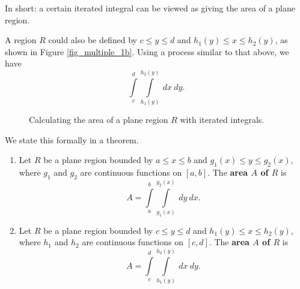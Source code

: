 In short: a certain iterated integral can be viewed as giving the area of a plane region.

A region $R$ could also be defined by $c\leq y\leq d$ and $h_1(y)\leq x\leq h_2(y)$, as shown in Figure \ref{fig_multiple_1b}. Using a process similar to that above, we have 
$$\int\limits_c^d\int\limits_{h_1(y)}^{h_2(y)} \ dx\ dy.$$


\begin{figure}[H]
\centering
\qquad
{}
\caption{Calculating the area of a plane region $R$ with iterated integrals. }
\end{figure}

We state this formally in a theorem.

\begin{theorem}\label{thm:area_plane_region}
\begin{enumerate}[align=left]
	\item Let $R$ be a plane region bounded by $a\leq x\leq b$ and $g_1(x)\leq y\leq g_2(x)$, where $g_1$ and $g_2$ are continuous functions on $[a,b]$. The \textbf{area $A$ of $R$} is
	$$A = \int\limits_a^b\int\limits_{g_1(x)}^{g_2(x)} \ dy\ dx.$$
	\item Let $R$ be a plane region bounded by $c\leq y\leq d$ and $h_1(y)\leq x\leq h_2(y)$, where $h_1$ and $h_2$ are continuous functions on $[c,d]$. The \textbf{area $A$ of $R$} is
	$$A = \int\limits_c^d\int\limits_{h_1(y)}^{h_2(y)} \ dx\ dy.$$
\end{enumerate}
\end{theorem}

